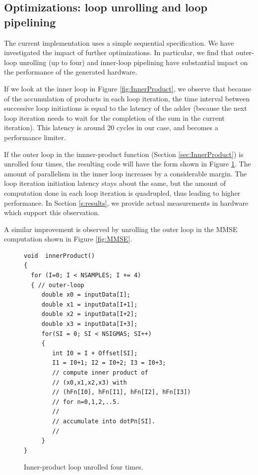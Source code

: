 \documentclass[conference]{IEEEtran}
\begin{document}
\subsection{Optimizations: loop unrolling and loop pipelining}

The current implementation uses a simple sequential specification.
We have investigated the impact of
further optimizations.  In particular, we find that outer-loop
unrolling (up to four) and inner-loop pipelining 
have substantial impact on the performance of the generated hardware.

If we look at the inner loop in Figure \ref{fig:InnerProduct},
we observe that because of the accumulation of products in each
loop iteration, the time interval between successive loop initiations
is equal to the latency of the adder (because the next loop iteration
needs to wait for the completion of the sum in the current iteration).  This
latency is around 20 cycles in our case, and becomes a performance limiter.

If the outer loop in the innner-product function
(Section \ref{sec:InnerProduct}) is unrolled four times, the 
resulting code will have the form shown in Figure \ref{fig:InnerProductUnrolled}.
The amount of parallelism in the inner loop increases by a considerable
margin.  The loop iteration initiation latency stays about the same, but the
amount of computation done in each loop iteration is quadrupled, thus
leading to higher performance.  In Section \ref{s:results}, we
provide actual measurements in hardware which support this observation.

A similar improvement is observed by unrolling the outer loop in the MMSE computation
shown in Figure \ref{fig:MMSE}.

\begin{figure}
\begin{centering}
\small\begin{verbatim}
void  innerProduct()
{
  for (I=0; I < NSAMPLES; I += 4)
  { // outer-loop
     double x0 = inputData[I];
     double x1 = inputData[I+1];
     double x2 = inputData[I+2];
     double x3 = inputData[I+3];
     for(SI = 0; SI < NSIGMAS; SI++)
     { 
        int I0 = I + Offset[SI];
        I1 = I0+1; I2 = I0+2; I3 = I0+3;
        // compute inner product of 
        // (x0,x1,x2,x3) with
        // (hFn[I0], hFn[I1], hFn[I2], hFn[I3])
        // for n=0,1,2,..5.
        // 
        // accumulate into dotPn[SI].
        //
     }
}
\end{verbatim}
\normalsize
\end{centering}
\caption{Inner-product loop unrolled four times.}
\label{fig:InnerProductUnrolled}
\end{figure}
\end{document}

